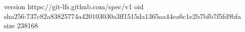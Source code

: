version https://git-lfs.github.com/spec/v1
oid sha256:737c82a83825774a420103030a3ff1515da1365aa44ea6c1e2b7bfb7f5fd9bfa
size 238168
